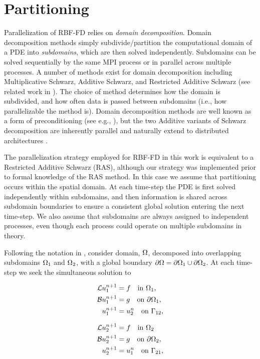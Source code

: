 \documentclass{report}
\begin{document}
\section{Partitioning}

Parallelization of RBF-FD relies on \emph{domain decomposition}. Domain decomposition methods simply subdivide/partition the computational domain of a PDE into \emph{subdomains}, which are then solved independently. Subdomains can be solved sequentially by the same MPI process or in parallel across multiple processes. A number of methods exist for domain decomposition including Multiplicative Schwarz, Additive Schwarz, and Restricted Additive Schwarz (see related work in \cite{Yokota2010,StCyr2007}). The choice of method determines how the domain is subdivided, and how often data is passed between subdomains (i.e., how parallelizable the method is). Domain decomposition methods are well known as a form of preconditioning (see e.g., \cite{Beatson2000, StCyr2007}), but the two Additive variants of Schwarz decomposition are inherently parallel and naturally extend to distributed architectures \cite{Yokota2010, Gropp1990}. 

The parallelization strategy employed for RBF-FD in this work is equivalent to a Restricted Additive Schwarz (RAS), although our strategy was implemented prior to formal knowledge of the RAS method. In this case we assume that partitioning occurs within the spatial domain. At each time-step the PDE is first solved independently within subdomains, and then information is shared across subdomain boundaries to ensure a consistent global solution entering the next time-step. We also assume that subdomains are always assigned to independent processes, even though each process could operate on multiple subdomains in theory. 

Following the notation in \cite{StCyr2007}, consider domain, $\Omega$, decomposed into overlapping subdomains $\Omega_1$ and $\Omega_2$, with a global boundary $\partial\Omega = \partial\Omega_1 \cup \partial\Omega_2$. At each time-step we seek the simultaneous solution to
\begin{center}
\begin{minipage}{0.4\linewidth}
\begin{align*}
\mathcal{L}u_{1}^{n+1} & = f \ \ \text{ in }\Omega_1,\\
\mathcal{B}u_{1}^{n+1} &= g \ \ \text{ on }\partial\Omega_1, \\
u_{1}^{n+1} & = u_2^{n} \ \ \text{ on }\Gamma_{12}, 
\end{align*}
\end{minipage}
\begin{minipage}{0.4\linewidth} 
\begin{align}
\mathcal{L}u_{2}^{n+1} & = f \ \ \text{ in }\Omega_2 \nonumber \\
\mathcal{B}u_{2}^{n+1} & = g \ \ \text{ on }\partial\Omega_2, \label{eq:rasm_example} \\
u_{2}^{n+1} & = u_1^{n} \ \ \text{ on }\Gamma_{21},  \nonumber
\end{align}
\end{minipage}
\end{center}
\ 
\end{document}
